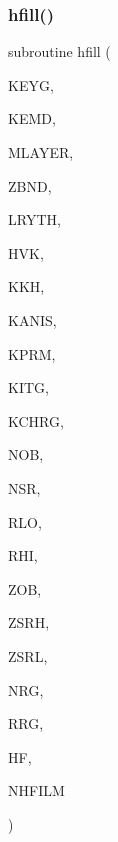 \subsubsection{\texorpdfstring{hfill()}{hfill()}}
{\footnotesize\ttfamily subroutine hfill (\begin{DoxyParamCaption}\item[{integer, intent(in)}]{K\+E\+YG,  }\item[{integer, intent(in)}]{K\+E\+MD,  }\item[{integer, intent(in)}]{M\+L\+A\+Y\+ER,  }\item[{real, dimension(0\+:mlayer), intent(in)}]{Z\+B\+ND,  }\item[{real, dimension(mlayer), intent(in)}]{L\+R\+Y\+TH,  }\item[{real, dimension(0\+:mlayer), intent(in)}]{H\+VK,  }\item[{complex, dimension(0\+:mlayer), intent(in)}]{K\+KH,  }\item[{integer, intent(in)}]{K\+A\+N\+IS,  }\item[{integer, intent(in)}]{K\+P\+RM,  }\item[{integer, intent(in)}]{K\+I\+TG,  }\item[{integer, intent(in)}]{K\+C\+H\+RG,  }\item[{integer, intent(in)}]{N\+OB,  }\item[{integer, intent(in)}]{N\+SR,  }\item[{real, intent(in)}]{R\+LO,  }\item[{real, intent(in)}]{R\+HI,  }\item[{real, intent(in)}]{Z\+OB,  }\item[{real, intent(in)}]{Z\+S\+RH,  }\item[{real, intent(in)}]{Z\+S\+RL,  }\item[{integer, intent(out)}]{N\+RG,  }\item[{real, dimension(nhfilm), intent(out)}]{R\+RG,  }\item[{complex, dimension(11,nhfilm), intent(inout)}]{HF,  }\item[{integer, intent(in)}]{N\+H\+F\+I\+LM }\end{DoxyParamCaption})}

